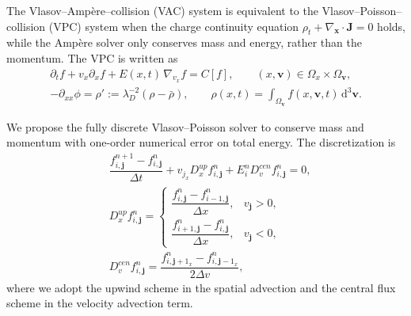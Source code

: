 \documentclass[preprint,1p,times]{elsarticle}
\theoremstyle{definition}
\theoremstyle{remark}
\begin{document}
The Vlasov–Amp\`ere–collision (VAC) system is equivalent to the Vlasov–Poisson–collision (VPC) system when the charge continuity equation $\rho_{t} + \nabla_{\bm{x}} \cdot \bm{J} = 0$ holds, while the Amp\`ere solver only conserves mass and energy, rather than the momentum.
The VPC is written as
\begin{equation}\label{eq:VP}
\begin{aligned}
    \partial_{t} f + v_{x} \partial_{x} f + E(x,t)\,\nabla_{v_{x}} f = C[f], \qquad (x,\bm{v}) \in \Omega_{x} \times \Omega_{\bm{v}}, \\
    -\partial_{xx}\phi = \rho' := \lambda_{D}^{-2}(\rho - \bar{\rho}), \qquad \rho(x,t) = \int_{\Omega_{\bm{v}}} f(x,\bm{v},t)\,\mathrm{d}^{3}\bm{v} .
\end{aligned}
\end{equation}

We propose the fully discrete Vlasov–Poisson solver to conserve mass and momentum with one-order numerical error on total energy.
The discretization is 
\begin{equation}
\begin{aligned}
    & \dfrac{f_{i,\bm{j}}^{n+1} - f_{i,\bm{j}}^{n}}{\Delta t} + v_{j_{x}} D_{x}^{up} f_{i,\bm{j}}^{n} + E_{i}^{n} D_{v}^{cen} f_{i,\bm{j}}^{n} = 0 , \\
    & D_{x}^{up} f_{i,\bm{j}}^{n} = \begin{cases}
        \dfrac{f_{i,\bm{j}}^{n} - f_{i-1,\bm{j}}^{n}}{\Delta x}, & v_{\bm{j}} > 0 , \\
        \dfrac{f_{i+1,\bm{j}}^{n} - f_{i,\bm{j}}^{n}}{\Delta x}, & v_{\bm{j}} < 0 ,
    \end{cases} \\
    & D_{v}^{cen} f_{i,\bm{j}}^{n} = \dfrac{f_{i,\bm{j}+1_{x}}^{n} - f_{i,\bm{j}-1_{x}}^{n}}{2 \Delta v} ,
\end{aligned}
\end{equation}
where we adopt the upwind scheme in the spatial advection and the central flux scheme in the velocity advection term.
\end{document}

